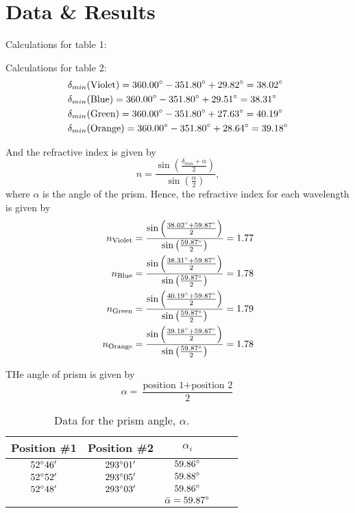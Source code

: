 \documentclass[10pt]{article}
\begin{document}
\section{Data \& Results}

Calculations for table 1:


Calculations for table 2:
\begin{align}
    &\delta_{min}(\text{Violet}) = 360.00\degree-351.80\degree+29.82\degree = 38.02\degree \\
    &\delta_{min}(\text{Blue}) = 360.00\degree-351.80\degree+29.51\degree = 38.31\degree \\
    &\delta_{min}(\text{Green}) = 360.00\degree-351.80\degree+27.63\degree = 40.19\degree \\
    &\delta_{min}(\text{Orange}) = 360.00\degree-351.80\degree+28.64\degree = 39.18\degree 
\end{align}

And the refractive index is given by
\begin{equation}
    n = \frac{\sin\left(\frac{\delta_{min}+\alpha}{2}\right)}{\sin\left(\frac{\alpha}{2}\right)},
\end{equation}
where $\alpha$ is the angle of the prism. Hence, the refractive index for each wavelength is given by
\begin{align}
    n_{\text{Violet}} &= \frac{\sin\left(\frac{38.02\degree+59.87\degree}{2}\right)}{\sin\left(\frac{59.87\degree}{2}\right)} = 1.77 \\
    n_{\text{Blue}} &= \frac{\sin\left(\frac{38.31\degree+59.87\degree}{2}\right)}{\sin\left(\frac{59.87\degree}{2}\right)} = 1.78 \\
    n_{\text{Green}} &= \frac{\sin\left(\frac{40.19\degree+59.87\degree}{2}\right)}{\sin\left(\frac{59.87\degree}{2}\right)} = 1.79 \\
    n_{\text{Orange}} &= \frac{\sin\left(\frac{39.18\degree+59.87\degree}{2}\right)}{\sin\left(\frac{59.87\degree}{2}\right)} = 1.78
\end{align}


THe angle of prism is given by
\begin{equation}
    \alpha = \dfrac{\text{position 1}+\text{position 2}}{2}
\end{equation}

\begin{table}[ht]
    \centering
    \begin{tabular}{|c|c|c|c|c|}
        \hline 
        Position \#1 & Position \#2 & $\alpha_i$ \\
        \hline
        $52\degree 46'$ & $293\degree 01'$ & $59.86\degree$ \\
        \hline
        $52\degree 52'$ & $293\degree 05'$ & $59.88\degree$ \\
        \hline
        $52\degree 48'$ & $293\degree 03'$ & $59.86\degree$ \\
        \hline
        & & $\bar{\alpha} = 59.87\degree$ \\
        \hline
    \end{tabular}
    \caption{Data for the prism angle, $\alpha$.}
    \label{tab:1}
\end{table}
\end{document}
